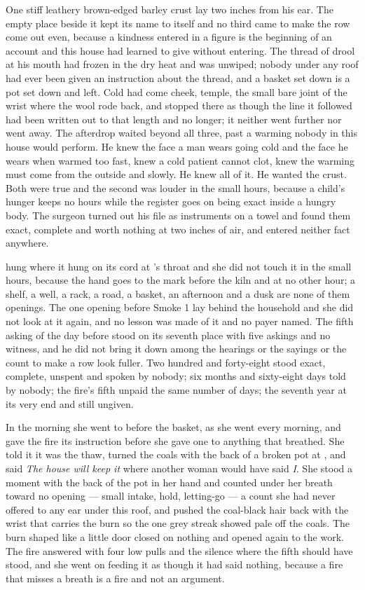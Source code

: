 One stiff leathery brown-edged barley crust lay two inches from his ear. The empty place beside it kept its name to itself and no third came to make the row come out even, because a kindness entered in a figure is the beginning of an account and this house had learned to give without entering. The thread of drool at his mouth had frozen in the dry heat and was unwiped; nobody under any roof had ever been given an instruction about the thread, and a basket set down is a pot set down and left. Cold had come cheek, temple, the small bare joint of the wrist where the wool rode back, and stopped there as though the line it followed had been written out to that length and no longer; it neither went further nor went away. The afterdrop waited beyond all three, past a warming nobody in this house would perform. He knew the face a man wears going cold and the face he wears when warmed too fast, knew a cold patient cannot clot, knew the warming must come from the outside and slowly. He knew all of it. He wanted the crust. Both were true and the second was louder in the small hours, because a child's hunger keeps no hours while the register goes on being exact inside a hungry body. The surgeon turned out his file as instruments on a towel and found them exact, complete and worth nothing at two inches of air, and entered neither fact anywhere.

 hung where it hung on its cord at 's throat and she did not touch it in the small hours, because the hand goes to the mark before the kiln and at no other hour; a shelf, a well, a rack, a road, a basket, an afternoon and a dusk are none of them openings. The one opening before Smoke 1 lay behind the household and she did not look at it again, and no lesson was made of it and no payer named. The fifth asking of the day before stood on its seventh place with five askings and no witness, and he did not bring it down among the hearings or the sayings or the count to make a row look fuller. Two hundred and forty-eight stood exact, complete, unspent and spoken by nobody; six months and sixty-eight days told by nobody; the fire's fifth unpaid the same number of days; the seventh year at its very end and still ungiven.

\scenebreak

In the morning she went to  before the basket, as she went every morning, and gave the fire its instruction before she gave one to anything that breathed. She told it it was the thaw, turned the coals with the back of a broken pot at , and said \emph{The house will keep it} where another woman would have said \emph{I}. She stood a moment with the back of the pot in her hand and counted under her breath toward no opening — small intake, hold, letting-go — a count she had never offered to any ear under this roof, and pushed the coal-black hair back with the wrist that carries the burn so the one grey streak showed pale off the coals. The burn shaped like a little door closed on nothing and opened again to the work. The fire answered with four low pulls and the silence where the fifth should have stood, and she went on feeding it as though it had said nothing, because a fire that misses a breath is a fire and not an argument.


